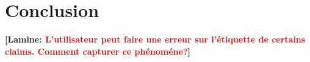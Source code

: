 \documentclass{sig-alternate}
\newcommand{\lamine}[1]{\textbf{[Lamine: {\textcolor{red}{#1}}]}}
\begin{document}










\section{Conclusion}
\lamine{L'utilisateur peut faire une erreur sur l'\'etiquette de certains claims. Comment capturer ce ph\'enom\'ene?}
\cite{*}


\end{document}
